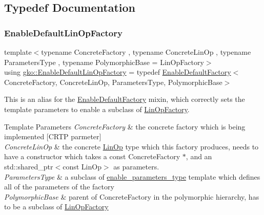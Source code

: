 \subsection{Typedef Documentation}
\mbox{\label{group__LinOp_ga24628d477cba68b31cea690572c51912}} 
\subsubsection{\texorpdfstring{Enable\+Default\+Lin\+Op\+Factory}{EnableDefaultLinOpFactory}}
{\footnotesize\ttfamily template$<$typename Concrete\+Factory , typename Concrete\+Lin\+Op , typename Parameters\+Type , typename Polymorphic\+Base  = Lin\+Op\+Factory$>$ \\
using \hyperlink{group__LinOp_ga24628d477cba68b31cea690572c51912}{gko\+::\+Enable\+Default\+Lin\+Op\+Factory} = typedef \hyperlink{classgko_1_1EnableDefaultFactory}{Enable\+Default\+Factory}$<$Concrete\+Factory, Concrete\+Lin\+Op, Parameters\+Type, Polymorphic\+Base$>$}



This is an alias for the \hyperlink{classgko_1_1EnableDefaultFactory}{Enable\+Default\+Factory} mixin, which correctly sets the template parameters to enable a subclass of \hyperlink{classgko_1_1LinOpFactory}{Lin\+Op\+Factory}. 


\begin{DoxyTemplParams}{Template Parameters}
{\em Concrete\+Factory} & the concrete factory which is being implemented \mbox{[}C\+R\+TP parmeter\mbox{]} \\
\hline
{\em Concrete\+Lin\+Op} & the concrete \hyperlink{classgko_1_1LinOp}{Lin\+Op} type which this factory produces, needs to have a constructor which takes a const Concrete\+Factory $\ast$, and an std\+::shared\+\_\+ptr$<$const Lin\+Op$>$ as parameters. \\
\hline
{\em Parameters\+Type} & a subclass of \hyperlink{structgko_1_1enable__parameters__type}{enable\+\_\+parameters\+\_\+type} template which defines all of the parameters of the factory \\
\hline
{\em Polymorphic\+Base} & parent of Concrete\+Factory in the polymorphic hierarchy, has to be a subclass of \hyperlink{classgko_1_1LinOpFactory}{Lin\+Op\+Factory} \\
\hline
\end{DoxyTemplParams}
